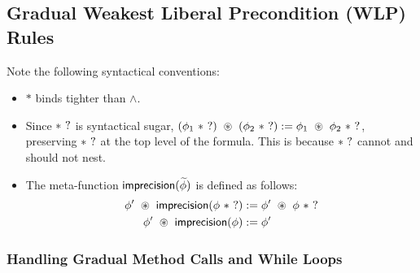 
\newpage
\subsection{Gradual Weakest Liberal Precondition (WLP) Rules}



\noindent
Note the following syntactical conventions:
\begin{itemize}
  \item
    $\ast$ binds tighter than $\land$.

  \item
    Since $\ast \ ?$ is syntactical sugar, $(\phi_1 \ \imprecise) \ \circast \ (\phi_2 \ \imprecise) := \phi_1 \ \circast \ \phi_2 \ \imprecise$, preserving $\ast \ ?$ at the top level of the formula. This is because $\ast \ ?$ cannot and should not nest.

  \item
    The meta-function $\textsf{imprecision}(\widetilde{\phi})$ is defined as follows:
    \begin{align*}
      \phi\p \ \circast \ \impr{\phi \ \imprecise} &:= \phi\p \ \circast \ \phi \ \imprecise \\
      \phi\p \ \circast \ \impr{\phi}              &:= \phi\p
    \end{align*}
\end{itemize}


\newpage
\subsubsection{Handling Gradual Method Calls and While Loops}


